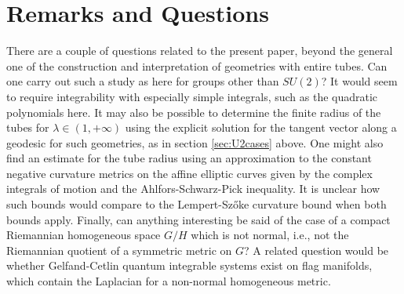 \documentclass[12pt,reqno]{amsart}\usepackage{amssymb,amsmath,amscd,epsfig,amsthm,enumerate,import,eufrak}
\theoremstyle{definition}
\theoremstyle{remark}
\numberwithin{equation}{section}
\theoremstyle{plain}
\theoremstyle{definition}
\def \vs {\vskip 2mm}
\theoremstyle{remark}
\numberwithin{theorem}{section}
\begin{document}
\section{Remarks and Questions}\label{sec:rmks}
%
There are a couple of questions related to the present paper, beyond the general one of the construction and interpretation of geometries with entire tubes. Can one carry out such a study as here for groups other than $SU(2)$? It would seem to require integrability with especially simple integrals, such as the quadratic polynomials here. It may also be possible to determine the finite radius of the tubes for $\lambda \in (1,+\infty)$ using the explicit solution for the tangent vector along a geodesic for such geometries, as in section \ref{sec:U2cases} above. One might also find an estimate for the tube radius using an approximation to the constant negative curvature metrics on the affine elliptic curves given by the complex integrals of motion and the Ahlfors-Schwarz-Pick inequality. It is unclear how such bounds would compare to the Lempert-Sz\H{o}ke curvature bound when both bounds apply. 
%
\vs
%
Finally, can anything interesting be said of the case of a compact Riemannian homogeneous space $G/H$ which is not normal, i.e., not the Riemannian quotient of a symmetric metric on $G$? A related question would be whether Gelfand-Cetlin quantum integrable systems exist on flag manifolds, which contain the Laplacian for a non-normal homogeneous metric. 
%
%
%
%
%
%
%
%
%
%
%
%
%
%
%
%
%
%
%
%
\end{document}
